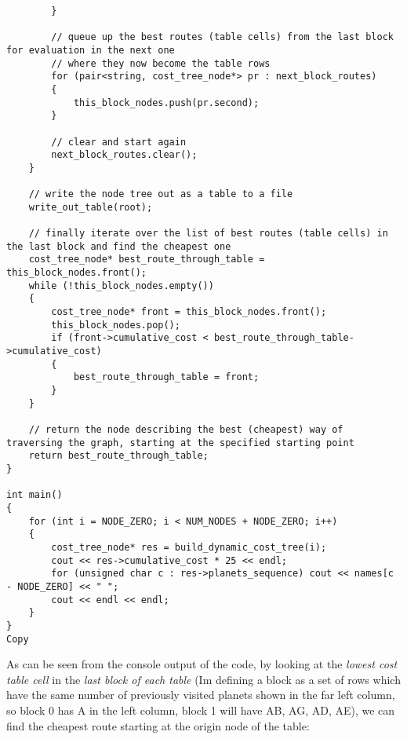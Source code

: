 \documentclass[
]{article}
\begin{document}
\begin{verbatim}
        }

        // queue up the best routes (table cells) from the last block for evaluation in the next one
        // where they now become the table rows
        for (pair<string, cost_tree_node*> pr : next_block_routes)
        {
            this_block_nodes.push(pr.second);
        }

        // clear and start again
        next_block_routes.clear();
    }

    // write the node tree out as a table to a file
    write_out_table(root);

    // finally iterate over the list of best routes (table cells) in the last block and find the cheapest one
    cost_tree_node* best_route_through_table = this_block_nodes.front();
    while (!this_block_nodes.empty())
    {
        cost_tree_node* front = this_block_nodes.front();
        this_block_nodes.pop();
        if (front->cumulative_cost < best_route_through_table->cumulative_cost)
        {
            best_route_through_table = front;
        }
    }

    // return the node describing the best (cheapest) way of traversing the graph, starting at the specified starting point
    return best_route_through_table;
}

int main()
{
    for (int i = NODE_ZERO; i < NUM_NODES + NODE_ZERO; i++)
    {
        cost_tree_node* res = build_dynamic_cost_tree(i);
        cout << res->cumulative_cost * 25 << endl;
        for (unsigned char c : res->planets_sequence) cout << names[c - NODE_ZERO] << " ";
        cout << endl << endl;
    }
}
Copy
\end{verbatim}

As can be seen from the console output of the code, by looking at the
\emph{lowest cost table cell} in the \emph{last block of each table}
(I\textquotesingle m defining a block as a set of rows which have the
same number of previously visited planets shown in the far left column,
so block 0 has \textquotesingle A\textquotesingle{} in the left column,
block 1 will have \textquotesingle AB\textquotesingle,
\textquotesingle AG\textquotesingle,
\textquotesingle AD\textquotesingle,
\textquotesingle AE\textquotesingle), we can find the cheapest route
starting at the origin node of the table:
\end{document}
